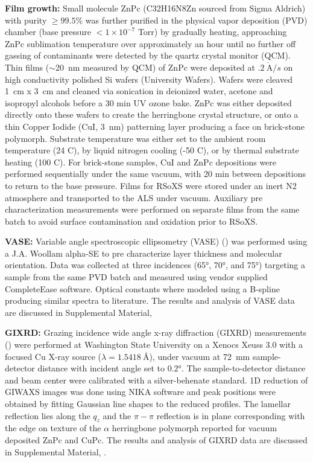 \textbf{Film growth:} Small molecule ZnPc (C32H16N8Zn sourced from Sigma Aldrich) with purity \(\geq 99.5\%\) was further purified in the physical vapor deposition (PVD) chamber (base pressure \(< 1 \times 10^{- 7}\) Torr) by gradually heating, approaching ZnPc sublimation temperature over approximately an hour until no further off gassing of contaminants were detected by the quartz crystal monitor (QCM). Thin films (\({\sim}\)\qty{20}{nm} measured by QCM) of ZnPc were deposited at \(.2\ \mathring{\mathrm{A}}/s\) on high conductivity polished Si wafers (University Wafers). Wafers were cleaved \qty{1}{cm} x \qty{3}{cm} and cleaned via sonication in deionized water, acetone and isopropyl alcohols before a 30 min UV ozone bake. ZnPc was either deposited directly onto these wafers to create the herringbone crystal structure, or onto a thin Copper Iodide (CuI, \qty{3}{nm}) patterning layer producing a face on brick-stone polymorph. Substrate temperature was either set to the ambient room temperature (24 C), by liquid nitrogen cooling (-50 C), or by thermal substrate heating (100 C). For brick-stone samples, CuI and ZnPc depositions were performed sequentially under the same vacuum, with 20 min between depositions to return to the base pressure. Films for RSoXS were stored under an inert N2 atmosphere and transported to the ALS under vacuum. Auxiliary pre characterization measurements were performed on separate films from the same batch to avoid surface contamination and oxidation prior to RSoXS.

\textbf{VASE:} Variable angle spectroscopic ellipsometry (VASE) () was performed using a J.A. Woollam alpha-SE to pre characterize layer thickness and molecular orientation. Data was collected at three incidences (\ang{65}, \ang{70}, and \ang{75}) targeting a sample from the same PVD batch and measured using vendor supplied CompleteEase software. Optical constants where modeled using a B-spline producing similar spectra to literature.\autocite{kozlikOpticalConstantsVZincIIPhthalocyanine2013} The results and analysis of VASE data are discussed in Supplemental Material, 

\textbf{GIXRD:} Grazing incidence wide angle x-ray diffraction (GIXRD) measurements () were performed at Washington State University on a Xenocs Xeuss 3.0 with a focused Cu X-ray source (\(\lambda = \qty{1.5418}{\angstrom}\)), under vacuum at \qty{72}{mm} sample-detector distance with incident angle set to \(\ang{0.2}\). The sample-to-detector distance and beam center were calibrated with a silver-behenate standard. 1D reduction of GIWAXS images was done using NIKA software\autocite{ilavskyNikaSoftwareTwodimensional2012} and peak positions were obtained by fitting Gaussian line shapes to the reduced profiles. The lamellar reflection lies along the \(q_{z}\) and the \(\pi - \pi\) reflection is in plane corresponding with the edge on texture of the \(\alpha\) herringbone polymorph reported for vacuum deposited ZnPc and CuPc.\autocite{hoshinoRedeterminationCrystalStructure2003} The results and analysis of GIXRD data are discussed in Supplemental Material, .

